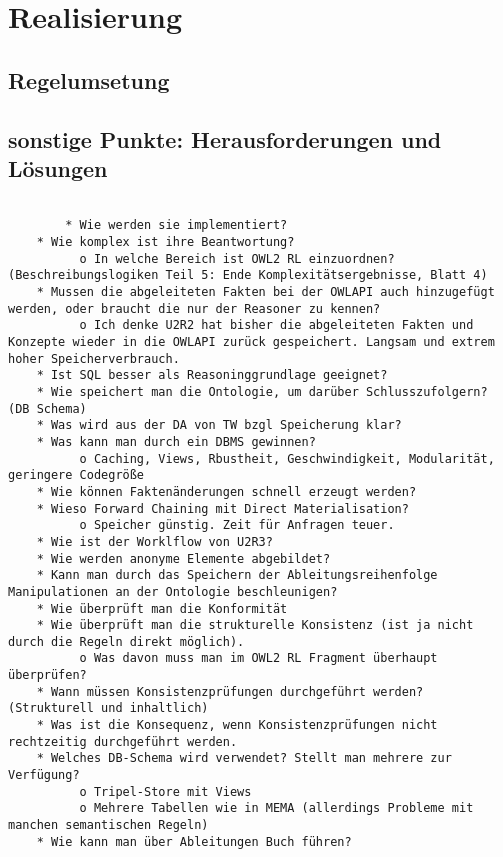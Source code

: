 \chapter{Realisierung}

\section{Regelumsetung}


\section{sonstige Punkte: Herausforderungen und Lösungen}




\begin{verbatim}
    
        * Wie werden sie implementiert?
    * Wie komplex ist ihre Beantwortung?
          o In welche Bereich ist OWL2 RL einzuordnen? (Beschreibungslogiken Teil 5: Ende Komplexitätsergebnisse, Blatt 4) 
    * Mussen die abgeleiteten Fakten bei der OWLAPI auch hinzugefügt werden, oder braucht die nur der Reasoner zu kennen?
          o Ich denke U2R2 hat bisher die abgeleiteten Fakten und Konzepte wieder in die OWLAPI zurück gespeichert. Langsam und extrem hoher Speicherverbrauch. 
    * Ist SQL besser als Reasoninggrundlage geeignet?
    * Wie speichert man die Ontologie, um darüber Schlusszufolgern? (DB Schema)
    * Was wird aus der DA von TW bzgl Speicherung klar?
    * Was kann man durch ein DBMS gewinnen?
          o Caching, Views, Rbustheit, Geschwindigkeit, Modularität, geringere Codegröße 
    * Wie können Faktenänderungen schnell erzeugt werden?
    * Wieso Forward Chaining mit Direct Materialisation?
          o Speicher günstig. Zeit für Anfragen teuer. 
    * Wie ist der Worklflow von U2R3?
    * Wie werden anonyme Elemente abgebildet?
    * Kann man durch das Speichern der Ableitungsreihenfolge Manipulationen an der Ontologie beschleunigen?
    * Wie überprüft man die Konformität
    * Wie überprüft man die strukturelle Konsistenz (ist ja nicht durch die Regeln direkt möglich).
          o Was davon muss man im OWL2 RL Fragment überhaupt überprüfen? 
    * Wann müssen Konsistenzprüfungen durchgeführt werden? (Strukturell und inhaltlich)
    * Was ist die Konsequenz, wenn Konsistenzprüfungen nicht rechtzeitig durchgeführt werden.
    * Welches DB-Schema wird verwendet? Stellt man mehrere zur Verfügung?
          o Tripel-Store mit Views
          o Mehrere Tabellen wie in MEMA (allerdings Probleme mit manchen semantischen Regeln) 
    * Wie kann man über Ableitungen Buch führen? 
\end{verbatim}

